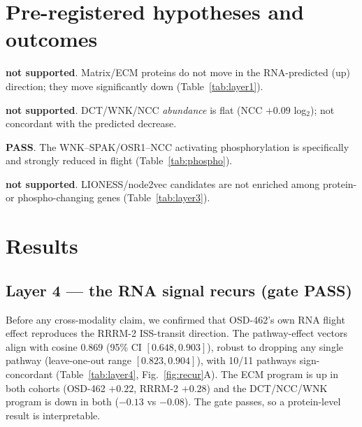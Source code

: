 \documentclass[11pt]{article}
\newcommand{\pass}{\textcolor{green!55!black}{\textbf{PASS}}}
\newcommand{\fail}{\textcolor{red!70!black}{\textbf{not supported}}}
\begin{document}
\section{Pre-registered hypotheses and outcomes}
\begin{description}[leftmargin=2.2em,style=nextline]
\item[H1 -- matrix protein concordance] \fail{}. Matrix/ECM proteins do not move in the
RNA-predicted (up) direction; they move significantly down (Table~\ref{tab:layer1}).
\item[H2 -- DCT protein concordance] \fail{}. DCT/WNK/NCC \emph{abundance} is flat
(NCC $+0.09$ log$_2$); not concordant with the predicted
decrease.
\item[H3 -- phospho activity] \pass{}. The WNK--SPAK/OSR1--NCC activating phosphorylation
is specifically and strongly reduced in flight (Table~\ref{tab:phospho}).
\item[H4 -- network translation] \fail{}. LIONESS/node2vec candidates are not enriched
among protein- or phospho-changing genes (Table~\ref{tab:layer3}).
\end{description}

\section{Results}

\subsection{Layer 4 --- the RNA signal recurs (gate \pass{})}
Before any cross-modality claim, we confirmed that OSD-462's own RNA flight effect
reproduces the RRRM-2 ISS-transit direction. The pathway-effect vectors align with cosine
$0.869$ (95\% CI $[0.648,0.903]$), robust to
dropping any single pathway (leave-one-out range
$[0.823,0.904]$), with
10/11 pathways sign-concordant (Table~\ref{tab:layer4},
Fig.~\ref{fig:recur}A). The ECM program is up in both cohorts (OSD-462
$+0.22$,
RRRM-2 $+0.28$)
and the DCT/NCC/WNK program is down in both
($-0.13$
vs $-0.08$).
The gate passes, so a protein-level result is interpretable.
\end{document}
